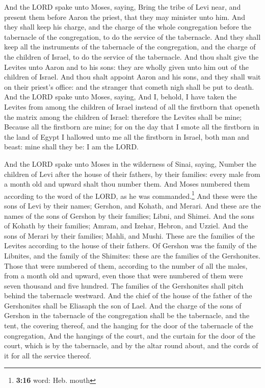 And the LORD spake unto Moses, saying, 
Bring the tribe of Levi near, and present them before Aaron the priest,
that they may minister unto him.  And they shall keep his
charge, and the charge of the whole congregation before the tabernacle
of the congregation, to do the service of the tabernacle. 
And they shall keep all the instruments of the tabernacle of the
congregation, and the charge of the children of Israel, to do the
service of the tabernacle.  And thou shalt give the
Levites unto Aaron and to his sons: they are wholly given unto him out
of the children of Israel.  And thou shalt appoint Aaron
and his sons, and they shall wait on their priest's office: and the
stranger that cometh nigh shall be put to death.  And the
LORD spake unto Moses, saying,  And I, behold, I have
taken the Levites from among the children of Israel instead of all the
firstborn that openeth the matrix among the children of Israel:
therefore the Levites shall be mine;  Because all the
firstborn are mine; for on the day that I smote all the firstborn in the
land of Egypt I hallowed unto me all the firstborn in Israel, both man
and beast: mine shall they be: I am the LORD.

 And the LORD spake unto Moses in the wilderness of
Sinai, saying,  Number the children of Levi after the
house of their fathers, by their families: every male from a month old
and upward shalt thou number them.  And Moses numbered
them according to the word of the LORD, as he was commanded.\footnote{\textbf{3:16}
  word: Heb. mouth}  And these were the sons of Levi by
their names; Gershon, and Kohath, and Merari.  And these
are the names of the sons of Gershon by their families; Libni, and
Shimei.  And the sons of Kohath by their families; Amram,
and Izehar, Hebron, and Uzziel.  And the sons of Merari
by their families; Mahli, and Mushi. These are the families of the
Levites according to the house of their fathers.  Of
Gershon was the family of the Libnites, and the family of the Shimites:
these are the families of the Gershonites.  Those that
were numbered of them, according to the number of all the males, from a
month old and upward, even those that were numbered of them were seven
thousand and five hundred.  The families of the
Gershonites shall pitch behind the tabernacle westward. 
And the chief of the house of the father of the Gershonites shall be
Eliasaph the son of Lael.  And the charge of the sons of
Gershon in the tabernacle of the congregation shall be the tabernacle,
and the tent, the covering thereof, and the hanging for the door of the
tabernacle of the congregation,  And the hangings of the
court, and the curtain for the door of the court, which is by the
tabernacle, and by the altar round about, and the cords of it for all
the service thereof.

